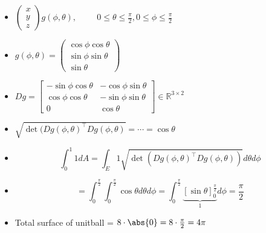 {\begin{bsp}
\begin{itemize}
		 \begin{itemize}\small
			\item[] $\left(\begin{array}{c}
			x\\
			y\\
			z
			\end{array} \right) g(\phi,\theta), \hspace{1cm}0 \leq \theta \leq \frac{\pi}{2}, 0 \leq \phi \leq \frac{\pi}{2}$\\
			\item[] $g(\phi,\theta) = \left(\begin{array}{c}
			\cos{\phi}\cos{\theta}\\
			\sin{\phi}\sin{\theta}\\
			\sin{\theta}
			\end{array}
			\right)$\\
			\item[] $Dg = \begin{bmatrix}
			-\sin{\phi}\cos{\theta} & -\cos{\phi}\sin{\theta}\\
			\cos{\phi}\cos{\theta} & -\sin{\phi}\sin{\theta}\\
			0 & \cos{\theta}
			\end{bmatrix} \in \mathbb{R}^{3\times2}$\\
			\item[] $\sqrt{\det(Dg(\phi,\theta)^\top Dg(\phi,\theta)} = \cdots = \cos{\theta}$\\
			\item[] \[\int_0^1 1 dA = \int_E 1\sqrt{\det(Dg(\phi,\theta)^\top Dg(\phi,\theta))}d\theta d\phi\]
			\item[] \[ = \int_0^{\frac{\pi}{2}}\int_0^{\frac{\pi}{2}} \cos{\theta}d\theta d\phi = \int_0^{\frac{\pi}{2}}\underbrace{[\sin{\theta}]_0^{\frac{\pi}{2}}}_{1} d\phi = \frac{\pi}{2}\] 
			\item[] Total surface of unitball = $8 \cdot \abs{0} = 8\cdot \frac{\pi}{2} = 4\pi$
		\end{itemize}
	\end{itemize}
\end{bsp}
}

